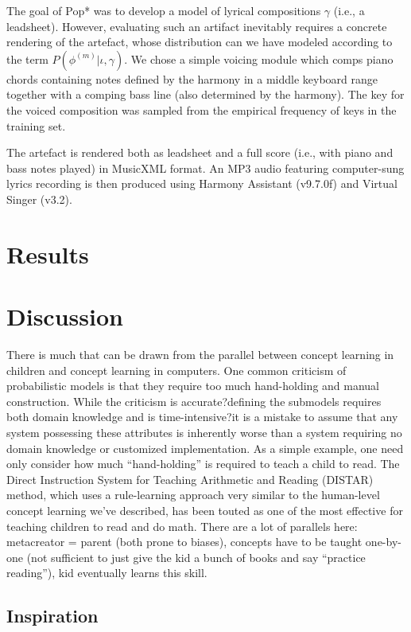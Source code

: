 \documentclass[letterpaper]{article}
\begin{document}
The goal of Pop* was to develop a model of lyrical compositions $\gamma$ (i.e., a leadsheet). However, evaluating such an artifact inevitably requires a concrete rendering of the artefact, whose distribution can we have modeled according to the term $P(\phi^{(m)}|\iota,\gamma)$. We chose a simple voicing module which comps piano chords containing notes defined by the harmony in a middle keyboard range together with a comping bass line (also determined by the harmony). The key for the voiced composition was sampled from the empirical frequency of keys in the training set. 

The artefact is rendered both as leadsheet and a full score (i.e., with piano and bass notes played) in MusicXML format. An MP3 audio featuring computer-sung lyrics recording is then produced using Harmony Assistant (v9.7.0f) and Virtual Singer (v3.2).

\section{Results}

\section{Discussion}

There is much that can be drawn from the parallel between concept learning in children and concept learning in computers. One common criticism of probabilistic models is that they require too much hand-holding and manual construction. While the criticism is accurate?defining the submodels requires both domain knowledge and is time-intensive?it is a mistake to assume that any system possessing these attributes is inherently worse than a system requiring no domain knowledge or customized implementation. As a simple example, one need only consider how much ``hand-holding'' is required to teach a child to read. The Direct Instruction System for Teaching Arithmetic and Reading (DISTAR) method, which uses a rule-learning approach very similar to the human-level concept learning we've described, has been touted as one of the most effective for teaching children to read and do math. There are a lot of parallels here: metacreator = parent (both prone to biases), concepts have to be taught one-by-one (not sufficient to just give the kid a bunch of books and say ``practice reading''), kid eventually learns this skill.

\subsection{Inspiration}
\end{document}
